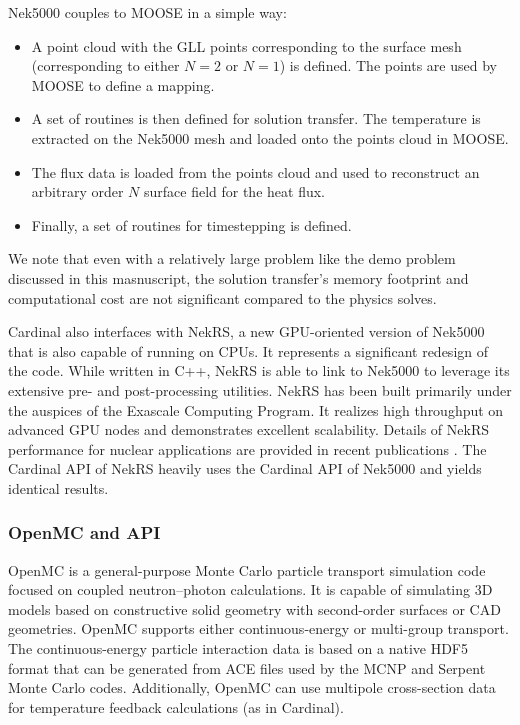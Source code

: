 Nek5000 couples to MOOSE in a simple way:
\begin{itemize}
\item A point cloud with the GLL points corresponding to the surface mesh (corresponding to either $N = 2$ or $N = 1$) is defined. The points are used by MOOSE to define a mapping.
\item A set of routines is then defined for solution transfer. The temperature is extracted on the Nek5000 mesh and loaded onto the points cloud in MOOSE.
\item The flux data is loaded from the points cloud and used to reconstruct an arbitrary order $N$ surface field for the heat
flux.
\item Finally, a set of routines for timestepping is defined.
\end{itemize}
We note that even with a relatively large problem like the demo problem
discussed in this masnuscript, the solution transfer's memory footprint and
computational cost are not significant compared to the physics solves.


Cardinal also interfaces with NekRS, a new GPU-oriented version of Nek5000
that is also capable of running on CPUs. It represents a significant redesign
of the code.  While written in C++, NekRS is able to link to Nek5000 to
leverage its extensive pre- and post-processing utilities.  NekRS has been
built primarily under the auspices of the Exascale Computing Program. It
realizes high throughput on advanced GPU nodes and demonstrates excellent
scalability.  Details of NekRS performance for nuclear applications are
provided in recent publications \cite{merzari2020toward}. The Cardinal API of
NekRS heavily uses the Cardinal API of Nek5000 and yields identical results.

\subsubsection{OpenMC and API}

OpenMC \cite{romano2015openmc} is a general-purpose Monte Carlo particle transport simulation code focused on coupled neutron--photon calculations. It is
capable of simulating 3D models based on constructive solid geometry with second-order surfaces or CAD geometries. OpenMC
supports either continuous-energy or multi-group transport. The continuous-energy particle interaction data
is based on a native HDF5 format that can be generated from ACE files used by the MCNP and Serpent
Monte Carlo codes. Additionally, OpenMC can use multipole cross-section data for temperature feedback
calculations (as in Cardinal).

